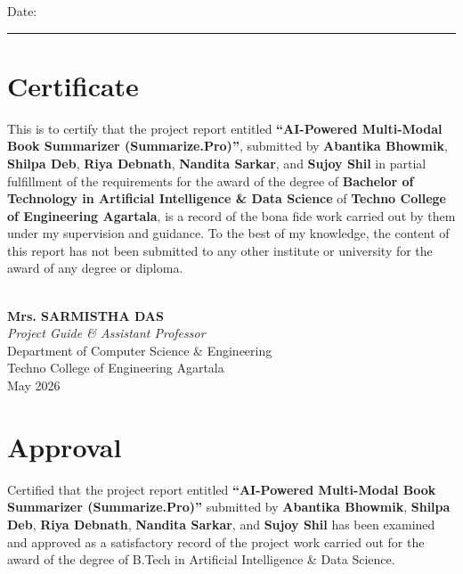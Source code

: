 \documentclass[12pt, a4paper]{report}
\begin{document}
\vspace{1cm}
\noindent Date: \rule{4.5cm}{0.4pt}

\chapter*{Certificate}
This is to certify that the project report entitled \textbf{``AI-Powered Multi-Modal Book Summarizer (Summarize.Pro)''}, submitted by \textbf{Abantika Bhowmik}, \textbf{Shilpa Deb}, \textbf{Riya Debnath}, \textbf{Nandita Sarkar}, and \textbf{Sujoy Shil} in partial fulfillment of the requirements for the award of the degree of \textbf{Bachelor of Technology in Artificial Intelligence \& Data Science} of \textbf{Techno College of Engineering Agartala}, is a record of the bona fide work carried out by them under my supervision and guidance. To the best of my knowledge, the content of this report has not been submitted to any other institute or university for the award of any degree or diploma.

\vspace{4cm}
\noindent
\begin{minipage}[t]{0.6\textwidth}
  \hrulefill\\
  \textbf{Mrs. SARMISTHA DAS}\\
  \textit{Project Guide \& Assistant Professor}\\
  Department of Computer Science \& Engineering\\
  Techno College of Engineering Agartala\\
  May 2026
\end{minipage}

\chapter*{Approval}
Certified that the project report entitled \textbf{``AI-Powered Multi-Modal Book Summarizer (Summarize.Pro)''} submitted by \textbf{Abantika Bhowmik}, \textbf{Shilpa Deb}, \textbf{Riya Debnath}, \textbf{Nandita Sarkar}, and \textbf{Sujoy Shil} has been examined and approved as a satisfactory record of the project work carried out for the award of the degree of B.Tech in Artificial Intelligence \& Data Science.
\end{document}
